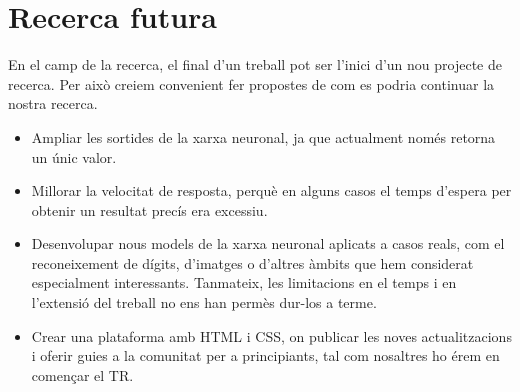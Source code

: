 \section{Recerca futura}
En el camp de la recerca, el final d'un treball pot ser l'inici d'un nou projecte de recerca. Per això creiem convenient fer propostes de com es podria continuar la nostra recerca.


\begin{itemize}

\item Ampliar les sortides de la xarxa neuronal, ja que actualment només retorna un únic valor.

\item Millorar la velocitat de resposta, perquè en alguns casos el temps d’espera per obtenir un resultat precís era excessiu.

\item Desenvolupar nous models de la xarxa neuronal aplicats a casos reals, com el reconeixement de dígits, d’imatges o d’altres àmbits que hem considerat especialment interessants. Tanmateix, les limitacions en el temps i en l’extensió del treball no ens han permès dur-los a terme.

\item Crear una plataforma amb HTML\cite{HTML} i CSS\cite{CSS}, on publicar les noves actualitzacions i oferir guies a la comunitat per a principiants, tal com nosaltres ho érem en començar el TR.

\end{itemize}

